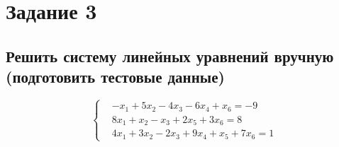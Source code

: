 \documentclass{report}
\begin{document}
	\chapter{Задание 3}
	
	\section{Решить систему линейных уравнений вручную (подготовить
		тестовые данные)}
	
	\[
	\left\{
	\begin{aligned}
		&-x_1 + 5x_2 - 4x_3 - 6x_4 + x_6 = -9 \\
		&8x_1 + x_2 - x_3 + 2x_5 + 3x_6 = 8 \\
		&4x_1 + 3x_2 - 2x_3 + 9x_4 + x_5 + 7x_6 = 1
	\end{aligned}
	\right.
	\]
	
\end{document}
